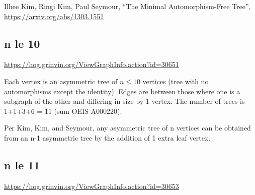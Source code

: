 \documentclass{article}
\begin{document}
Ilhee Kim, Ringi Kim, Paul Seymour, ``The Minimal Automorphism-Free
Tree'', \url{https://arxiv.org/abs/1303.1551}

\subsection{n le 10}

\url{https://hog.grinvin.org/ViewGraphInfo.action?id=30651}

\smallskip

Each vertex is an asymmetric tree of $n \le 10$ vertices (tree with no
automorphisms except the identity).  Edges are between those where one
is a subgraph of the other and differing in size by 1 vertex.  The
number of trees is 1+1+3+6 = 11 (sum OEIS A000220).

Per Kim, Kim, and Seymour, any asymmetric tree of n vertices can be
obtained from an n-1 asymmetric tree by the addition of 1 extra leaf
vertex.

\smallskip

\begin{center}
\end{center}

\subsection{n le 11}

\url{https://hog.grinvin.org/ViewGraphInfo.action?id=30653}
\end{document}
